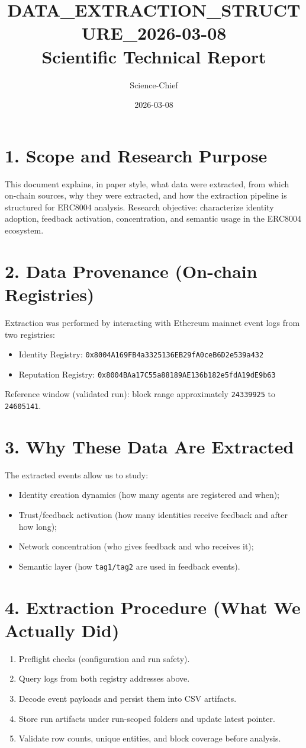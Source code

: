 \documentclass[11pt,a4paper]{article}
\title{DATA\_EXTRACTION\_STRUCTURE\_2026-03-08\\Scientific Technical Report}
\author{Science-Chief}
\date{2026-03-08}
\begin{document}
\maketitle

\section*{1. Scope and Research Purpose}
This document explains, in paper style, what data were extracted, from which on-chain sources, why they were extracted, and how the extraction pipeline is structured for ERC8004 analysis.
Research objective: characterize identity adoption, feedback activation, concentration, and semantic usage in the ERC8004 ecosystem.

\section*{2. Data Provenance (On-chain Registries)}
Extraction was performed by interacting with Ethereum mainnet event logs from two registries:
\begin{itemize}
\item Identity Registry: \texttt{0x8004A169FB4a3325136EB29fA0ceB6D2e539a432}
\item Reputation Registry: \texttt{0x8004BAa17C55a88189AE136b182e5fdA19dE9b63}
\end{itemize}
Reference window (validated run): block range approximately \texttt{24339925} to \texttt{24605141}.

\section*{3. Why These Data Are Extracted}
The extracted events allow us to study:
\begin{itemize}
\item Identity creation dynamics (how many agents are registered and when);
\item Trust/feedback activation (how many identities receive feedback and after how long);
\item Network concentration (who gives feedback and who receives it);
\item Semantic layer (how \texttt{tag1/tag2} are used in feedback events).
\end{itemize}

\section*{4. Extraction Procedure (What We Actually Did)}
\begin{enumerate}
\item Preflight checks (configuration and run safety).
\item Query logs from both registry addresses above.
\item Decode event payloads and persist them into CSV artifacts.
\item Store run artifacts under run-scoped folders and update latest pointer.
\item Validate row counts, unique entities, and block coverage before analysis.
\end{enumerate}
\end{document}
